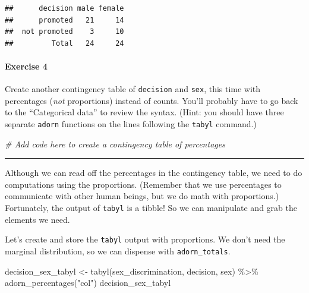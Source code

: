 \documentclass[
]{book}
\newenvironment{Shaded}{\begin{snugshade}}{\end{snugshade}}
\newcommand{\CommentTok}[1]{\textcolor[rgb]{0.56,0.35,0.01}{\textit{#1}}}
\newcommand{\FunctionTok}[1]{\textcolor[rgb]{0.00,0.00,0.00}{#1}}
\newcommand{\NormalTok}[1]{#1}
\newcommand{\OtherTok}[1]{\textcolor[rgb]{0.56,0.35,0.01}{#1}}
\newcommand{\SpecialCharTok}[1]{\textcolor[rgb]{0.00,0.00,0.00}{#1}}
\newcommand{\StringTok}[1]{\textcolor[rgb]{0.31,0.60,0.02}{#1}}
\begin{document}
\begin{verbatim}
##      decision male female
##      promoted   21     14
##  not promoted    3     10
##         Total   24     24
\end{verbatim}

\hypertarget{exercise-4-5}{%
\paragraph*{Exercise 4}\label{exercise-4-5}}

Create another contingency table of \texttt{decision} and \texttt{sex}, this time with percentages (\emph{not} proportions) instead of counts. You'll probably have to go back to the ``Categorical data'' to review the syntax. (Hint: you should have three separate \texttt{adorn} functions on the lines following the \texttt{tabyl} command.)

\begin{Shaded}
\begin{Highlighting}[]
\CommentTok{\# Add code here to create a contingency table of percentages}
\end{Highlighting}
\end{Shaded}

\begin{center}\rule{0.5\linewidth}{0.5pt}\end{center}

Although we can read off the percentages in the contingency table, we need to do computations using the proportions. (Remember that we use percentages to communicate with other human beings, but we do math with proportions.) Fortunately, the output of \texttt{tabyl} is a tibble! So we can manipulate and grab the elements we need.

Let's create and store the \texttt{tabyl} output with proportions. We don't need the marginal distribution, so we can dispense with \texttt{adorn\_totals}.

\begin{Shaded}
\begin{Highlighting}[]
\NormalTok{decision\_sex\_tabyl }\OtherTok{\textless{}{-}} \FunctionTok{tabyl}\NormalTok{(sex\_discrimination, decision, sex) }\SpecialCharTok{\%\textgreater{}\%}
    \FunctionTok{adorn\_percentages}\NormalTok{(}\StringTok{"col"}\NormalTok{)}
\NormalTok{decision\_sex\_tabyl}
\end{Highlighting}
\end{Shaded}
\end{document}
